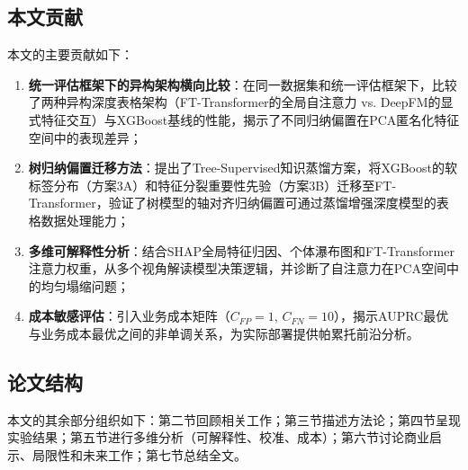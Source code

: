\subsection{本文贡献}

本文的主要贡献如下：

\begin{enumerate}
    \item \textbf{统一评估框架下的异构架构横向比较}：在同一数据集和统一评估框架下，比较了两种异构深度表格架构（FT-Transformer的全局自注意力 vs. DeepFM的显式特征交互）与XGBoost基线的性能，揭示了不同归纳偏置在PCA匿名化特征空间中的表现差异；
    \item \textbf{树归纳偏置迁移方法}：提出了Tree-Supervised知识蒸馏方案，将XGBoost的软标签分布（方案3A）和特征分裂重要性先验（方案3B）迁移至FT-Transformer，验证了树模型的轴对齐归纳偏置可通过蒸馏增强深度模型的表格数据处理能力；
    \item \textbf{多维可解释性分析}：结合SHAP全局特征归因、个体瀑布图和FT-Transformer注意力权重，从多个视角解读模型决策逻辑，并诊断了自注意力在PCA空间中的均匀塌缩问题；
    \item \textbf{成本敏感评估}：引入业务成本矩阵（$C_{FP}=1$, $C_{FN}=10$），揭示AUPRC最优与业务成本最优之间的非单调关系，为实际部署提供帕累托前沿分析。
\end{enumerate}

\subsection{论文结构}

本文的其余部分组织如下：第二节回顾相关工作；第三节描述方法论；第四节呈现实验结果；第五节进行多维分析（可解释性、校准、成本）；第六节讨论商业启示、局限性和未来工作；第七节总结全文。
